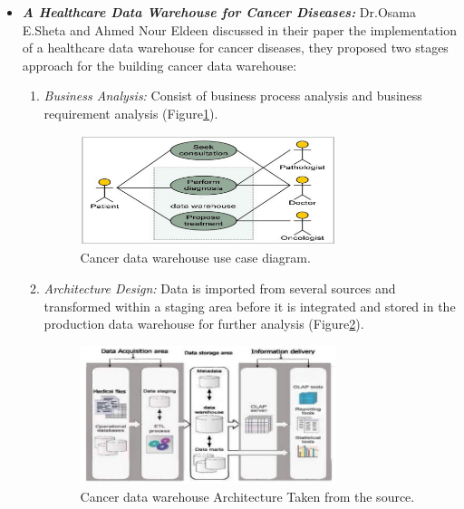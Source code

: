 \begin{itemize}
  \item \textbf{\textit{A Healthcare Data Warehouse for Cancer Diseases:}} Dr.Osama E.Sheta and Ahmed Nour Eldeen discussed in their paper\cite{shetaBuildingHealthCare2012} the implementation of a healthcare data warehouse for cancer diseases, they proposed  two stages approach for the building cancer data warehouse: 
  \newpage
  \begin{enumerate}
    \item \textit{Business Analysis:} Consist of business process analysis and business requirement analysis (Figure\ref{fig:cancerDiagrame}).
    \begin{figure}[h!]
      \center
      \includegraphics[width=0.75\textwidth]{images/chapter2/cancerDiagrame.PNG}
      \caption{Cancer data warehouse use case diagram.}
      \label{fig:cancerDiagrame}
    \end{figure}
    \item \textit{Architecture Design:} Data is imported from several sources and transformed within a staging area before it is integrated and stored in the production data warehouse for further analysis (Figure\ref{fig:cancersystem}).
     \begin{figure}[h!]
      \center
      \includegraphics[width=0.75\textwidth]{images/chapter2/cancersystem.PNG}
      \caption{Cancer data warehouse Architecture Taken from the source.}
      \label{fig:cancersystem}
    \end{figure}
    \end{enumerate}
    

\end{itemize}
